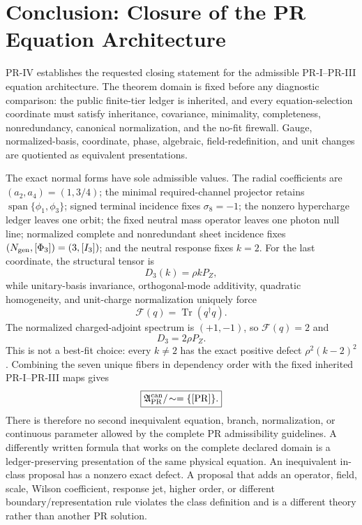 \section{Conclusion: Closure of the PR Equation Architecture}
\label{sec:conclusion}

PR-IV establishes the requested closing statement for the admissible PR-I--PR-III equation architecture.  The theorem domain is fixed before any diagnostic comparison: the public finite-tier ledger is inherited, and every equation-selection coordinate must satisfy inheritance, covariance, minimality, completeness, nonredundancy, canonical normalization, and the no-fit firewall.  Gauge, normalized-basis, coordinate, phase, algebraic, field-redefinition, and unit changes are quotiented as equivalent presentations.

The exact normal forms have sole admissible values.  The radial coefficients are $(a_2,a_4)=(1,3/4)$; the minimal required-channel projector retains $\operatorname{span}\{\phi_1,\phi_3\}$; signed terminal incidence fixes $\sigma_8=-1$; the nonzero hypercharge ledger leaves one orbit; the fixed neutral mass operator leaves one photon null line; normalized complete and nonredundant sheet incidence fixes $(N_{\rm gen},[\Phi_3])=(3,[I_3])$; and the neutral response fixes $k=2$. For the last coordinate, the structural tensor is
\begin{equation}
 D_3(k)=\rho kP_Z,
 \label{eq:pr35-pr3-structural-tensor}
\end{equation}
while unitary-basis invariance, orthogonal-mode additivity, quadratic
homogeneity, and unit-charge normalization uniquely force
\begin{equation}
 \mathcal F(q)=\operatorname{Tr}(q^\dagger q).
\end{equation}
The normalized charged-adjoint spectrum is $(+1,-1)$, so
$\mathcal F(q)=2$ and
\begin{equation}
 \boxed{D_3=2\rho P_Z.}
\end{equation}
This is not a best-fit choice: every $k\ne2$ has the exact positive defect
$\rho^2(k-2)^2$. Combining the seven unique fibers in dependency order with the fixed inherited
PR-I--PR-III maps gives
\begin{equation}
 \boxed{
 \mathfrak A_{\rm PR}^{\rm can}/\!\sim
 =\{[\mathrm{PR}]\}.}
\end{equation}
There is therefore no second inequivalent equation, branch, normalization, or continuous parameter allowed by the complete PR admissibility guidelines.  A differently written formula that works on the complete declared domain is a ledger-preserving presentation of the same physical equation.  An inequivalent in-class proposal has a nonzero exact defect.  A proposal that adds an operator, field, scale, Wilson  \cite{Wilson_1975} coefficient, response jet, higher order, or different boundary/representation rule violates the class definition and is a different theory rather than another PR solution.

